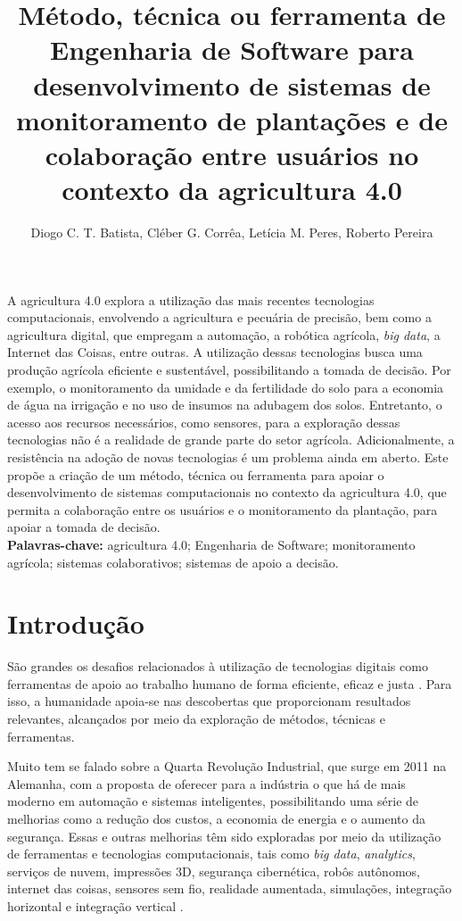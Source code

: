 \documentclass[12pt]{article}
\title{Método, técnica ou ferramenta de Engenharia de Software para desenvolvimento de sistemas de monitoramento de plantações e de colaboração entre usuários no contexto da agricultura 4.0}
\author{Diogo C. T. Batista\inst{1}, Cléber G. Corrêa\inst{2}, Letícia M. Peres\inst{1}, Roberto Pereira\inst{1}}
\begin{document}
 

\maketitle
     
\begin{resumo} 
A agricultura 4.0 explora a utilização das mais recentes tecnologias computacionais, envolvendo a agricultura e pecuária de precisão, bem como a agricultura digital, que empregam a automação, a robótica agrícola, \textit{big data}, a Internet das Coisas, entre outras. A utilização dessas tecnologias busca uma produção agrícola eficiente e sustentável, possibilitando a tomada de decisão. Por exemplo, o monitoramento da umidade e da fertilidade do solo para a economia de água na irrigação e no uso de insumos na adubagem dos solos. Entretanto, o acesso aos recursos necessários, como sensores, para a exploração dessas tecnologias não é a realidade de grande parte do setor agrícola. Adicionalmente, a resistência na adoção de novas tecnologias é um problema ainda em aberto. Este propõe a criação de um método, técnica ou ferramenta para apoiar o desenvolvimento de sistemas computacionais no contexto da agricultura 4.0, que permita a colaboração entre os usuários e o monitoramento da plantação, para apoiar a tomada de decisão. \\

\textbf{Palavras-chave:} agricultura 4.0; Engenharia de Software; monitoramento agrícola; sistemas colaborativos; sistemas de apoio a decisão.
\end{resumo}

\section{Introdução}
\label{sec:introducao}

São grandes os desafios relacionados à utilização de tecnologias digitais como ferramentas de apoio ao trabalho humano de forma eficiente, eficaz e justa \cite{Rose:2019}. Para isso, a humanidade apoia-se nas descobertas que proporcionam resultados relevantes, alcançados por meio da exploração de métodos, técnicas e ferramentas.

Muito tem se falado sobre a Quarta Revolução Industrial, que surge em 2011 na Alemanha, com a proposta de oferecer para a indústria o que há de mais moderno em automação e sistemas inteligentes, possibilitando uma série de melhorias como a redução dos custos, a economia de energia e o aumento da segurança. Essas e outras melhorias têm sido exploradas por meio da utilização de ferramentas e tecnologias computacionais, tais como \textit{big data}, \textit{analytics}, serviços de nuvem, impressões 3D, segurança cibernética, robôs autônomos, internet das coisas, sensores sem fio, realidade aumentada, simulações, integração horizontal e integração vertical \cite{Souza:2017}.
\end{document}
